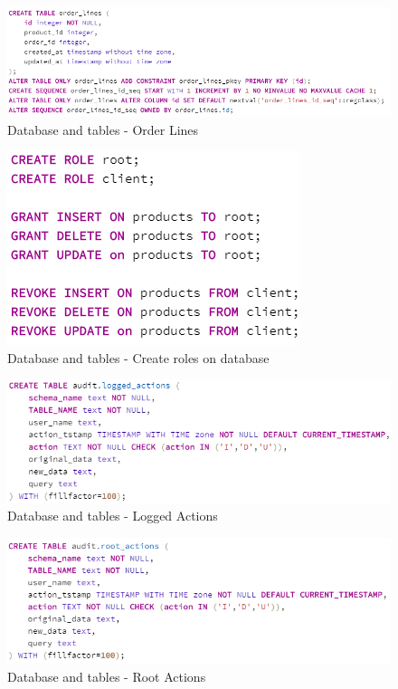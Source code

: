 \documentclass{article}
\begin{document}
\begin{figure}
\centering
\includegraphics[scale=0.8]{12}
\caption{Database and tables - Order Lines}
\end{figure}
\begin{figure}
\centering
\includegraphics[scale=1]{13}
\caption{Database and tables - Create roles on database}
\end{figure}
\begin{figure}
\centering
\includegraphics[scale=0.8]{14}
\caption{Database and tables - Logged Actions}
\end{figure}
\begin{figure}
\centering
\includegraphics[scale=0.8]{15}
\caption{Database and tables - Root Actions}
\end{figure}
\end{document}
